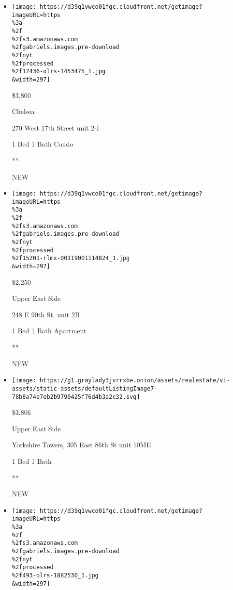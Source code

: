 \begin{itemize}
\item
  \href{/real-estate/usa/ny/new-york/chelsea/homes-for-rent/270-west-17th-street/12436-OLRS-1453475?}{}

  \texttt{[image: https://d39q1vwco01fgc.cloudfront.net/getimage?imageURL=https\\\%3a\\\%2f\\\%2fs3.amazonaws.com\\\%2fgabriels.images.pre-download\\\%2fnyt\\\%2fprocessed\\\%2f12436-olrs-1453475\_1.jpg\\\&width=297]}

  \$3,800

  Chelsea

  270 West 17th Street unit 2-I

  1 Bed \textbar{} 1 Bath \textbar{} Condo

  **

  NEW
\item
  \href{/real-estate/usa/ny/new-york/upper-east-side/homes-for-rent/248-e-90th-st/15201-RLMX-00119001114824?}{}

  \texttt{[image: https://d39q1vwco01fgc.cloudfront.net/getimage?imageURL=https\\\%3a\\\%2f\\\%2fs3.amazonaws.com\\\%2fgabriels.images.pre-download\\\%2fnyt\\\%2fprocessed\\\%2f15201-rlmx-00119001114824\_1.jpg\\\&width=297]}

  \$2,250

  Upper East Side

  248 E 90th St. unit 2B

  1 Bed \textbar{} 1 Bath \textbar{} Apartment

  **

  NEW
\item
  \href{/real-estate/usa/ny/new-york/upper-east-side/homes-for-rent/yorkshire-towers-305-east-86th-st/46-4322149?}{}

  \texttt{[image: https://g1.graylady3jvrrxbe.onion/assets/realestate/vi-assets/static-assets/defaultListingImage7-78b8a74e7eb2b9790425f76d4b3a2c32.svg]}

  \$3,806

  Upper East Side

  Yorkshire Towers, 305 East 86th St unit 10ME

  1 Bed \textbar{} 1 Bath \textbar{}

  **

  NEW
\item
  \href{/real-estate/usa/ny/new-york/financial-district/homes-for-rent/15-william-street/493-OLRS-1882530?}{}

  \texttt{[image: https://d39q1vwco01fgc.cloudfront.net/getimage?imageURL=https\\\%3a\\\%2f\\\%2fs3.amazonaws.com\\\%2fgabriels.images.pre-download\\\%2fnyt\\\%2fprocessed\\\%2f493-olrs-1882530\_1.jpg\\\&width=297]}


\end{itemize}
